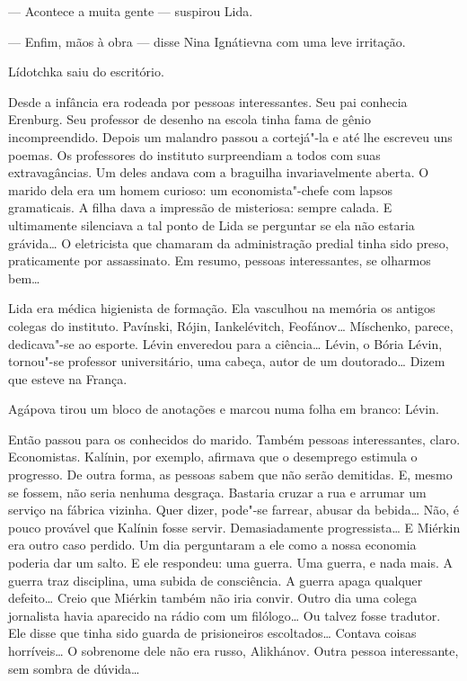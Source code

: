 --- Acontece a muita gente --- suspirou Lida.

--- Enfim, mãos à obra --- disse Nina Ignátievna com uma leve irritação.

Lídotchka saiu do escritório.

Desde a infância era rodeada por pessoas interessantes. Seu pai conhecia
Erenburg. Seu professor de desenho na escola tinha fama de gênio
incompreendido. Depois um malandro passou a cortejá"-la e até lhe
escreveu uns poemas. Os professores do instituto surpreendiam a todos
com suas extravagâncias. Um deles andava com a braguilha invariavelmente
aberta. O marido dela era um homem curioso: um economista"-chefe com
lapsos gramaticais. A filha dava a impressão de misteriosa: sempre
calada. E ultimamente silenciava a tal ponto de Lida se perguntar se ela
não estaria grávida\ldots{} O eletricista que chamaram da administração
predial tinha sido preso, praticamente por assassinato. Em resumo,
pessoas interessantes, se olharmos bem\ldots{}

Lida era médica higienista de formação. Ela vasculhou na memória os
antigos colegas do instituto. Pavínski, Rójin, Iankelévitch, Feofánov\ldots{}
Míschenko, parece, dedicava"-se ao esporte. Lévin enveredou para a
ciência\ldots{} Lévin, o Bória Lévin, tornou"-se professor universitário, uma
cabeça, autor de um doutorado\ldots{} Dizem que esteve na França.

Agápova tirou um bloco de anotações e marcou numa folha em branco:
Lévin.

Então passou para os conhecidos do marido. Também pessoas interessantes,
claro. Economistas. Kalínin, por exemplo, afirmava que o desemprego
estimula o progresso. De outra forma, as pessoas sabem que não serão
demitidas. E, mesmo se fossem, não seria nenhuma desgraça. Bastaria
cruzar a rua e arrumar um serviço na fábrica vizinha. Quer dizer,
pode"-se farrear, abusar da bebida\ldots{} Não, é pouco provável que Kalínin
fosse servir. Demasiadamente progressista\ldots{} E Miérkin era outro caso
perdido. Um dia perguntaram a ele como a nossa economia poderia dar um
salto. E ele respondeu: uma guerra. Uma guerra, e nada mais. A guerra
traz disciplina, uma subida de consciência. A guerra apaga qualquer
defeito\ldots{} Creio que Miérkin também não iria convir. Outro dia uma \label{ref1}
colega jornalista havia aparecido na rádio com um filólogo\ldots{} Ou talvez
fosse tradutor. Ele disse que tinha sido guarda de prisioneiros
escoltados\ldots{} Contava coisas horríveis\ldots{} O sobrenome dele não era
russo, Alikhánov. Outra pessoa interessante, sem sombra de dúvida\ldots{}


